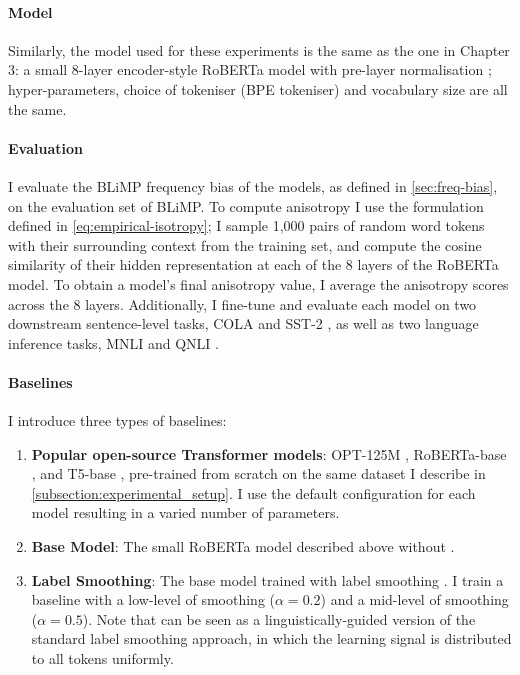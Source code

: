 \paragraph{Model} Similarly, the model used for these experiments is the same as the one in Chapter 3: a small 8-layer encoder-style RoBERTa model with pre-layer normalisation \citep{huebner2021babyberta}; hyper-parameters, choice of tokeniser (BPE tokeniser) and vocabulary size are all the same. 

\paragraph{Evaluation} I evaluate the BLiMP frequency bias of the models, as defined in \cref{sec:freq-bias}, on the evaluation set of BLiMP. To compute anisotropy I use the formulation defined in \cref{eq:empirical-isotropy}; I sample 1,000 pairs of random word tokens with their surrounding context from the training set, and compute the cosine similarity of their hidden representation at each of the 8 layers of the RoBERTa model. To obtain a model's final anisotropy value, I average the anisotropy scores across the 8 layers. Additionally, I fine-tune and evaluate each model on two downstream sentence-level tasks, COLA \citep{warstadt2019cola} and SST-2 \citep{socher2013sst}, as well as two language inference tasks, MNLI \citep{williams2018mnli} and QNLI \citep{rajpurkar2016squad, wang2018glue}.


\paragraph{Baselines}

I introduce three types of baselines: 
\begin{enumerate}
    \item \textbf{Popular open-source Transformer models}: OPT-125M \citep{zhang2022opt}, RoBERTa-base \citep{liu2019roberta}, and T5-base \citep{raffel2020t5}, pre-trained from scratch on the same dataset I describe in \cref{subsection:experimental_setup}. I use the default configuration for each model resulting in a varied number of parameters.
    \item \textbf{Base Model}: The small RoBERTa model described above without \smoothing.
    \item \textbf{Label Smoothing}: The base model trained with label smoothing \citep{szegedy2016rethinking}. I train a baseline with a low-level of smoothing ($\alpha=0.2$) and a mid-level of smoothing ($\alpha=0.5$). Note that \smoothing can be seen as a linguistically-guided version of the standard label smoothing approach, in which the learning signal is distributed to all tokens uniformly.
\end{enumerate}



